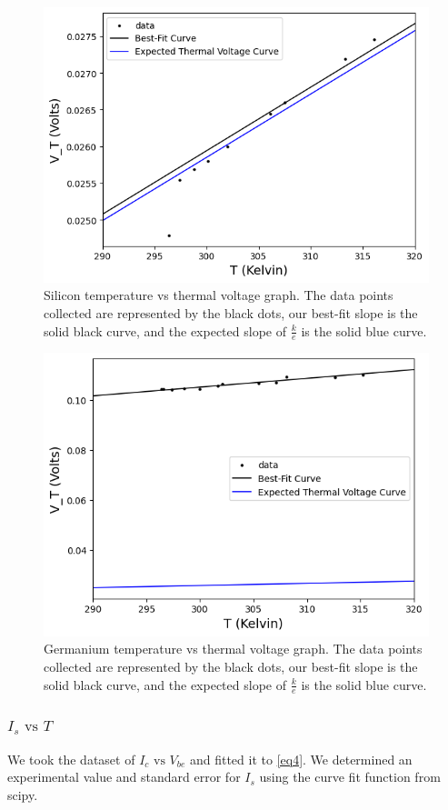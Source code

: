 \documentclass[12pt,letterpaper,twocolumn]{article}
\begin{document}
\begin{figure}[H]
	\includegraphics[width = .5\textwidth]{2_6SiBoltz.png}
	\caption{Silicon temperature vs thermal voltage graph. The data points collected are represented by the black dots, our best-fit slope is the solid black curve, and the expected slope of $\frac{k}{e}$ is the solid blue curve.\label{g1}}
\end{figure}
\begin{figure}[H]
	\includegraphics[width = .5\textwidth]{GeBoltz.png}
	\caption{Germanium temperature vs thermal voltage graph. The data points collected are represented by the black dots, our best-fit slope is the solid black curve, and the expected slope of $\frac{k}{e}$ is the solid blue curve.\label{g2}}
\end{figure}

\subsubsection{$I_s \text{ vs }T$}
We took the dataset of $I_c \text{ vs }V_{be}$ and fitted it to \ref{eq4}. We determined an experimental value and standard error for $I_s$ using the curve fit function from scipy.
\end{document}
